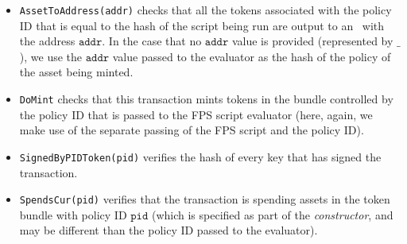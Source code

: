 \begin{itemize}
  \item \texttt{AssetToAddress(addr)}
  checks that all the tokens associated with the policy ID that
  is equal to the hash of the script being run are output
  to an \UTXO\ with the address $\texttt{addr}$. In the case that no $\texttt{addr}$ value is
  provided (represented by $\_$), we use the $\texttt{addr}$ value passed to the evaluator as
  the hash of the policy of the asset being minted.

  \item \texttt{DoMint}
  checks that this transaction mints tokens in the bundle controlled by the policy ID that is passed
  to the FPS script evaluator (here, again, we make use of the separate passing of
  the FPS script and the policy ID).

  \item \texttt{SignedByPIDToken(pid)} verifies the hash of every key that has signed the transaction.

  \item \texttt{SpendsCur(pid)}
  verifies that the transaction is spending assets in the token bundle with policy
  ID $\texttt{pid}$ (which is specified as part of the \emph{constructor}, and may be different
  than the policy ID passed to the evaluator).

\end{itemize}
